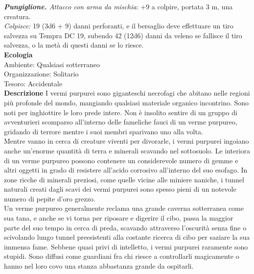 \begin{multicols}{2}
\emph{\textbf{Pungiglione.} Attacco con arma da mischia}: +9 a colpire, portata 3 m, una creatura.\\

\emph{Colpisce:} 19 (3d6 + 9) danni perforanti, e il bersaglio deve effettuare un tiro salvezza su Tempra DC 19, subendo 42 (12d6) danni da veleno se fallisce il tiro salvezza, o la metà di questi danni se lo riesce.\\
\textbf{Ecologia}\\
Ambiente: Qualsiasi sotterraneo\\
Organizzazione: Solitario\\
Tesoro: Accidentale\\
\textbf{Descrizione}
I vermi purpurei sono giganteschi necrofagi che abitano nelle regioni più profonde del mondo, mangiando qualsiasi materiale organico incontrino. Sono noti per inghiottire le loro prede intere. Non è insolito sentire di un gruppo di avventurieri scomparso all’interno delle fameliche fauci di un verme purpureo, gridando di terrore mentre i suoi membri sparivano uno alla volta.\\

Mentre vanno in cerca di creature viventi per divorarle, i vermi purpurei ingoiano anche un’enorme quantità di terra e minerali scavando nel sottosuolo. Le interiora di un verme purpureo possono contenere un considerevole numero di gemme e altri oggetti in grado di resistere all’acido corrosivo all’interno del suo esofago. In zone ricche di minerali preziosi, come quelle vicine alle miniere naniche, i tunnel naturali creati dagli scavi dei vermi purpurei sono spesso pieni di un notevole numero di pepite d’oro grezzo.\\

Un verme purpureo generalmente reclama una grande caverna sotterranea come sua tana, e anche se vi torna per riposare e digerire il cibo, passa la maggior parte del suo tempo in cerca di preda, scavando attraverso l’oscurità senza fine o scivolando lungo tunnel preesistenti alla costante ricerca di cibo per saziare la sua immensa fame. Sebbene quasi privi di intelletto, i vermi purpurei raramente sono stupidi. Sono diffusi come guardiani fra chi riesce a controllarli magicamente o hanno nel loro covo una stanza abbastanza grande da ospitarli.\\


\end{multicols}
